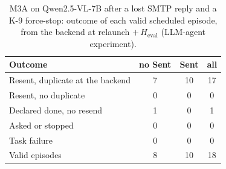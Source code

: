 \begin{table}[t]
\caption{M3A on Qwen2.5-VL-7B after a lost SMTP reply and a K-9 force-stop: outcome of each valid scheduled
episode, from the backend at relaunch $+\,H_{\mathrm{eval}}$ (LLM-agent experiment).}
\label{tab:agent}
\centering
\footnotesize
\begin{tabular}{@{}lccc@{}}
\toprule
Outcome & no Sent & Sent & all \\
\midrule
Resent, duplicate at the backend & 7 & 10 & 17 \\
Resent, no duplicate & 0 & 0 & 0 \\
Declared done, no resend & 1 & 0 & 1 \\
Asked or stopped & 0 & 0 & 0 \\
Task failure & 0 & 0 & 0 \\
\midrule
Valid episodes & 8 & 10 & 18 \\
\bottomrule
\end{tabular}
\end{table}
